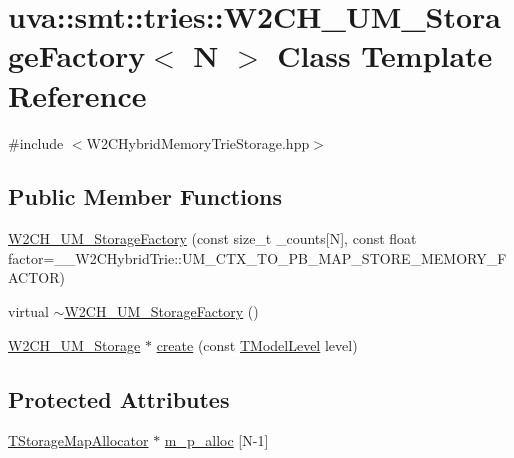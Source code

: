 \hypertarget{classuva_1_1smt_1_1tries_1_1_w2_c_h___u_m___storage_factory}{}\section{uva\+:\+:smt\+:\+:tries\+:\+:W2\+C\+H\+\_\+\+U\+M\+\_\+\+Storage\+Factory$<$ N $>$ Class Template Reference}
\label{classuva_1_1smt_1_1tries_1_1_w2_c_h___u_m___storage_factory}


{\ttfamily \#include $<$W2\+C\+Hybrid\+Memory\+Trie\+Storage.\+hpp$>$}

\subsection*{Public Member Functions}
\begin{DoxyCompactItemize}
\item 
\hyperlink{classuva_1_1smt_1_1tries_1_1_w2_c_h___u_m___storage_factory_a26c5ff34de8c0303cf672a5190fea8e4}{W2\+C\+H\+\_\+\+U\+M\+\_\+\+Storage\+Factory} (const size\+\_\+t \+\_\+counts\mbox{[}N\mbox{]}, const float factor=\+\_\+\+\_\+\+W2\+C\+Hybrid\+Trie\+::\+U\+M\+\_\+\+C\+T\+X\+\_\+\+T\+O\+\_\+\+P\+B\+\_\+\+M\+A\+P\+\_\+\+S\+T\+O\+R\+E\+\_\+\+M\+E\+M\+O\+R\+Y\+\_\+\+F\+A\+C\+T\+O\+R)
\item 
virtual \hyperlink{classuva_1_1smt_1_1tries_1_1_w2_c_h___u_m___storage_factory_ae917d7ffecfd46ceff8e0af32ae624d0}{$\sim$\+W2\+C\+H\+\_\+\+U\+M\+\_\+\+Storage\+Factory} ()
\item 
\hyperlink{classuva_1_1smt_1_1tries_1_1_w2_c_h___u_m___storage}{W2\+C\+H\+\_\+\+U\+M\+\_\+\+Storage} $\ast$ \hyperlink{classuva_1_1smt_1_1tries_1_1_w2_c_h___u_m___storage_factory_a4aded7ed343feb6f8f955448e19f6d1f}{create} (const \hyperlink{namespaceuva_1_1smt_1_1tries_a20577a44b3a42d26524250634379b7cb}{T\+Model\+Level} level)
\end{DoxyCompactItemize}
\subsection*{Protected Attributes}
\begin{DoxyCompactItemize}
\item 
\hyperlink{namespaceuva_1_1smt_1_1tries_a80642b3331407e41b0aca518e3a1ac31}{T\+Storage\+Map\+Allocator} $\ast$ \hyperlink{classuva_1_1smt_1_1tries_1_1_w2_c_h___u_m___storage_factory_aff21d6e056fe54bcd597336aff02ef0b}{m\+\_\+p\+\_\+alloc} \mbox{[}N-\/1\mbox{]}
\end{DoxyCompactItemize}


